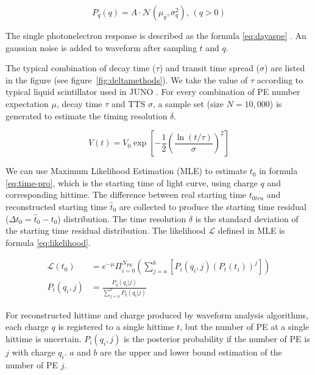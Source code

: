 \begin{equation}
    P_{q}(q) = A\cdot\mathcal{N}(\mu_{q},\sigma_{q}^{2}),\,(q>0)
    \label{eq:truncated}
\end{equation}

The single photonelectron response is described as the formula \eqref{eq:dayaspe} \cite{jetter_pmt_2012}. An gaussian noise is added to waveform after sampling $t$ and $q$. 

The typical combination of decay time ($\tau$) and transit time spread ($\sigma$) are listed in the figure (see figure~\ref{fig:deltamethods}). We take the value of $\tau$ according to typical liquid scintillator used in JUNO \cite{ludhova_particle_2020}. For every combination of PE number expectation $\mu$, decay time $\tau$ and TTS $\sigma$, a sample set (size $N=10,000$) is generated to estimate the timing resolution $\delta$. 

\begin{equation}
    V(t) = V_{0}\exp\left[-\frac{1}{2}\left(\frac{\ln(t/\tau)}{\sigma}\right)^{2}\right]
    \label{eq:dayaspe}
\end{equation}

We can use Maximum Likelihood Estimation (MLE) to estimate $t_{0}$ in formula \eqref{eq:time-pro}, which is the starting time of light curve, using charge $q$ and corresponding hittime. The difference between real starting time $t_{0tru}$ and reconstructed starting time $\hat{t}_0$ are collected to produce the starting time residual ($\Delta t_{0}=\hat{t}_0-t_0$) distribution. The time resolution $\delta$ is the standard deviation of the starting time residual distribution. The likelihood $\mathcal{L}$ defined in MLE is formula \eqref{eq:likelihood}. 

\begin{align}
    \mathcal{L}(t_{0}) &= e^{-\mu}\Pi_{i=0}^{N_\mathrm{PE}}\left(\sum_{j=a}^{b}[P_{i}(q_{i},j)(P_{t}(t_{i}))^{j}]\right)
    \label{eq:likelihood} \\
    P_{i}(q_{i},j) &= \frac{P_{q}(q_{i}|j)}{\sum_{j=a}^{b}P_{q}(q_{i}|j)}
\end{align}

For reconstructed hittime and charge produced by waveform analysis algorithms, each charge $q$ is registered to a single hittime $t$, but the number of PE at a single hittime is uncertain. $P_{i}(q_{i},j)$ is the posterior probability if the number of PE is $j$ with charge $q_{i}$. $a$ and $b$ are the upper and lower bound estimation of the number of PE $j$. 

